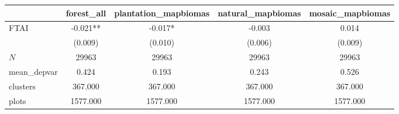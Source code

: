 {
\def\sym#1{\ifmmode^{#1}\else\(^{#1}\)\fi}
\begin{tabular}{l*{4}{c}}
\toprule
          &\multicolumn{1}{c}{forest\_all}&\multicolumn{1}{c}{plantation\_mapbiomas}&\multicolumn{1}{c}{natural\_mapbiomas}&\multicolumn{1}{c}{mosaic\_mapbiomas}\\
\midrule
FTAI      &   -0.021** &   -0.017*  &   -0.003   &    0.014   \\
          &  (0.009)   &  (0.010)   &  (0.006)   &  (0.009)   \\
\midrule
\(N\)     &    29963   &    29963   &    29963   &    29963   \\
mean\_depvar&    0.424   &    0.193   &    0.243   &    0.526   \\
clusters  &  367.000   &  367.000   &  367.000   &  367.000   \\
plots     & 1577.000   & 1577.000   & 1577.000   & 1577.000   \\
\bottomrule
\end{tabular}
}
